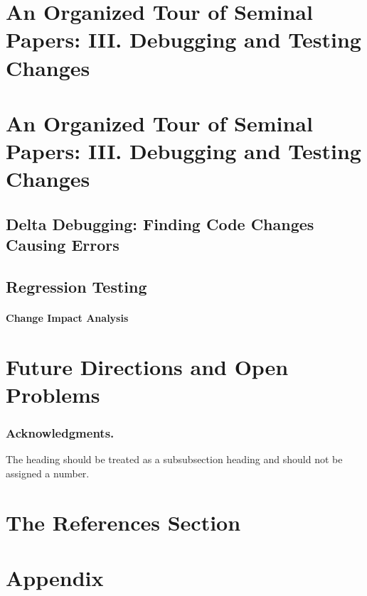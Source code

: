 \documentclass[runningheads,a4paper]{llncs}
\begin{document}

\section{An Organized Tour of Seminal Papers: III. Debugging and Testing Changes}
\label{sec:debugtest}


\section{An Organized Tour of Seminal Papers: III. Debugging and Testing Changes} 


\subsection{Delta Debugging: Finding Code Changes Causing Errors}
\subsection{Regression Testing} 
\paragraph{Change Impact Analysis} 

\section{Future Directions and Open Problems} 


\subsubsection*{Acknowledgments.} The heading should be treated as a
subsubsection heading and should not be assigned a number.

\section{The References Section}\label{references}



\section*{Appendix} 
\end{document}
